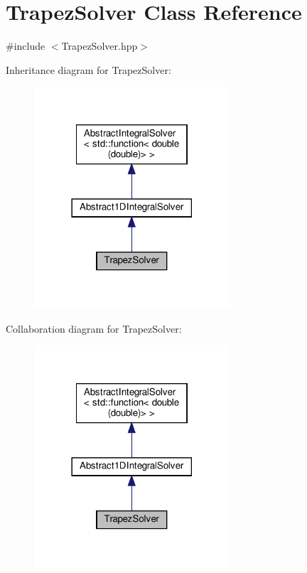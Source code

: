 \hypertarget{class_trapez_solver}{}\section{Trapez\+Solver Class Reference}
\label{class_trapez_solver}


{\ttfamily \#include $<$Trapez\+Solver.\+hpp$>$}



Inheritance diagram for Trapez\+Solver\+:\nopagebreak
\begin{figure}[H]
\begin{center}
\leavevmode
\includegraphics[width=206pt]{class_trapez_solver__inherit__graph}
\end{center}
\end{figure}


Collaboration diagram for Trapez\+Solver\+:\nopagebreak
\begin{figure}[H]
\begin{center}
\leavevmode
\includegraphics[width=206pt]{class_trapez_solver__coll__graph}
\end{center}
\end{figure}
